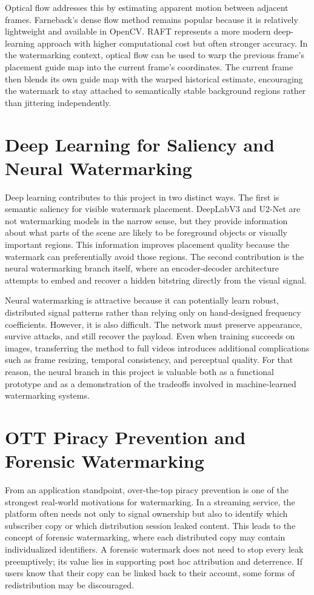 \documentclass[12pt,oneside]{report}
\begin{document}
Optical flow addresses this by estimating apparent motion between adjacent frames. Farneback's dense flow method remains popular because it is relatively lightweight and available in OpenCV. RAFT represents a more modern deep-learning approach with higher computational cost but often stronger accuracy. In the watermarking context, optical flow can be used to warp the previous frame's placement guide map into the current frame's coordinates. The current frame then blends its own guide map with the warped historical estimate, encouraging the watermark to stay attached to semantically stable background regions rather than jittering independently.

\section{Deep Learning for Saliency and Neural Watermarking}
Deep learning contributes to this project in two distinct ways. The first is semantic saliency for visible watermark placement. DeepLabV3 and U2-Net are not watermarking models in the narrow sense, but they provide information about what parts of the scene are likely to be foreground objects or visually important regions. This information improves placement quality because the watermark can preferentially avoid those regions. The second contribution is the neural watermarking branch itself, where an encoder-decoder architecture attempts to embed and recover a hidden bitstring directly from the visual signal.

Neural watermarking is attractive because it can potentially learn robust, distributed signal patterns rather than relying only on hand-designed frequency coefficients. However, it is also difficult. The network must preserve appearance, survive attacks, and still recover the payload. Even when training succeeds on images, transferring the method to full videos introduces additional complications such as frame resizing, temporal consistency, and perceptual quality. For that reason, the neural branch in this project is valuable both as a functional prototype and as a demonstration of the tradeoffs involved in machine-learned watermarking systems.

\section{OTT Piracy Prevention and Forensic Watermarking}
From an application standpoint, over-the-top piracy prevention is one of the strongest real-world motivations for watermarking. In a streaming service, the platform often needs not only to signal ownership but also to identify which subscriber copy or which distribution session leaked content. This leads to the concept of forensic watermarking, where each distributed copy may contain individualized identifiers. A forensic watermark does not need to stop every leak preemptively; its value lies in supporting post hoc attribution and deterrence. If users know that their copy can be linked back to their account, some forms of redistribution may be discouraged.
\end{document}
